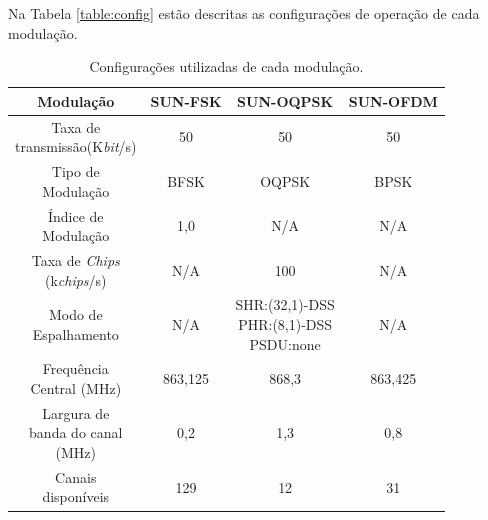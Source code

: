 Na Tabela \ref{table:config} estão descritas as configurações de operação de cada modulação.
\begin{table}[h!]
  \centering
  \caption{Configurações utilizadas de cada modulação.}
  \begin{tabular}{|c c c c|}
    \hline
    Modulação & SUN-FSK                     & SUN-OQPSK         & SUN-OFDM \\ [0.5ex]
    \hline\hline
    \makecell{Taxa de                                                      \\transmissão(K\emph{bit}/s)    } & 50      & 50                       & 50       \\\hline
    \makecell{Tipo de                                                      \\Modulação                     } & BFSK    & OQPSK                    & BPSK     \\\hline
    \makecell{Índice de                                                    \\Modulação                   } & 1,0     & N/A                      & N/A      \\\hline
    \makecell{Taxa de \emph{Chips}                                         \\(k\emph{chips}/s) } &   N/A      & 100                      & N/A      \\\hline
    \makecell{Modo de                                                      \\Espalhamento                  } & N/A     & \makecell{SHR:(32,1)-DSS            \\ PHR:(8,1)-DSS\\ PSDU:none} & N/A      \\\hline
    \makecell{Frequência                                                   \\Central (MHz)              } & 863,125   & 868,3                      & 863,425    \\\hline
    \makecell{Largura de                                                   \\banda do canal                                                               \\(MHz)        } & 0,2     & 1,3                     & 0,8      \\\hline
    \makecell{Canais                                                       \\disponíveis                    } & 129     & 12                       & 31       \\\hline

\end{tabular}
\end{table}

